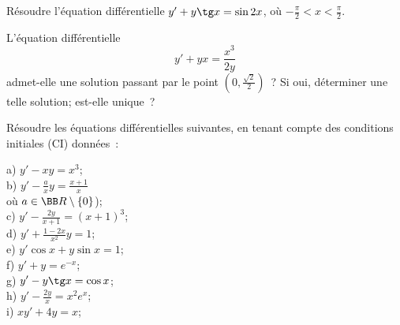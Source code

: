 \documentclass[12pt,french,oneside,a4paper]{memoir} %
\begin{document}
\begin{exo}
Résoudre l'équation différentielle
$y'+y\tg x=\sin 2x$, 
où $\displaystyle{-\frac{\pi}{2}<x<\frac{\pi}{2}}$.
\end{exo}

\begin{exo}
L'équation différentielle
\begin{equation*}
y'+yx=\displaystyle{\frac{x^3}{2y}}
\end{equation*}
admet-elle une solution passant par le point
$\displaystyle{(0,\frac{\sqrt 2}{2})}$~? Si oui, déterminer une
telle solution; est-elle unique~?
\end{exo}
\begin{exo}
Résoudre les équations différentielles suivantes, en
tenant compte des conditions initiales (CI) données~:

\hfill
\begin{minipage}[t]{6cm}
a) $\displaystyle{y'-xy=x^3}$;\\[2mm]
b) $\displaystyle{y'-\frac{a}{x}y=\frac{x+1}{x}}$\\
\hspace*{5mm}où $a\in\BB R\setminus\{0\}$);\\[2mm]
c) $\displaystyle{y'-\frac{2y}{x+1}=(x+1)^3}$;\\[2mm]
d) $\displaystyle{y'+\frac{1-2x}{x^2}y=1}$;\\[2mm]
e) $\displaystyle{y'\cos x+y\sin x=1}$;\\[2mm]
f) $\displaystyle{y'+y=e^{-x}}$;\\[2mm]
g) $\displaystyle{y'-y\tg x=\cos x}$;\\[2mm]
h) $\displaystyle{y'-\frac{2y}{x}=x^2e^x}$;\\[2mm]
i) $\displaystyle{}xy'+4y=x$;


\end{minipage}
\end{exo}
\end{document}

